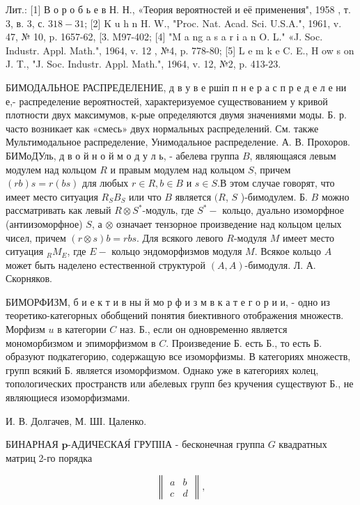 \documentclass[10pt]{article}
\begin{document}
Лит.: [1] В о р о б ь е в Н. Н., «Теория вероятностей и её применения", 1958 , т. 3, в. 3, с. $318-31$; [2] K u h n H. W., "Proc. Nat. Acad. Sci. U.S.A.", 1961, v. 47, № 10, p. 1657-62, [3. M97-402; [4] "M a ng a s a r i a n O. L." «J. Soc. Industr. Appl. Math.", 1964, v. 12 , №4, p. 778-80; [5] L e m k e C. E., H ow s on J. T., "J. Soc. Industr. Appl. Math.", 1964, v. 12, №2, p. 413-23.



БИМОДАЛЬНОЕ РАСПРЕДЕЛЕНИЕ, д в у в е ршіп п н е р а с п р е д е л е ни е,- распределение вероятностей, характеризуемое существованием у кривой плотности двух максимумов, к-рые определяются двумя значениями моды. Б. р. часто возникает как «смесь» двух нормальных распределений. См. также Мультимодальное распределение, Унимодальное распределение. А. В. Прохоров. БИМоДУль, д в о й н о й м о д у л ь, - абелева группа $B$, являющаяся левым модулем над кольцом $R$ и правым модулем над кольцом $S$, причем $(r b) s=r(b s)$ для любых $r \in R, b \in B$ и $s \in S$.В этом случае говорят, что имеет место ситуация $R_{S} B_{S}$ или что $B$ является $(R$, $S$ )-бимодулем. Б. $B$ можно рассматривать как левый $R \otimes S^{*}$-модуль, где $S^{*}-$ кольцо, дуально изоморфное (антиизоморфное) $S$, а $\otimes$ означает тензорное произведение над кольцом целых чисел, причем $(r \otimes s) b=r b s$. Для всякого левого $R$-модуля $M$ имеет место ситуация ${ }_{R} M_{E}$, где $E-$ кольцо эндоморфизмов модуля $M$. Всякое кольцо $A$ может быть наделено естественной структурой $(A, A)$-бимодуля. Л. А. Скорняков.



БИМОРФИЗМ, б и е к т и в ны й мо р ф и з м в к а т е г о р и и, - одно из теоретико-категорных обобщений понятия биективного отображения множеств. Морфизм $u$ в категории $C$ наз. Б., если он одновременно является мономорбизмом и эпиморфизмом в $C$. Произведение Б. есть Б., то есть Б. образуют подкатегорию, содержащую все изоморфизмы. В категориях множеств, групп всякий Б. является изоморфизмом. Однако уже в категориях колец, топологических пространств или абелевых групп без кручения существуют Б., не являющиеся изоморфизмами.



И. В. Долгачев, М. ШІ. Цаленко.



БИНАРНАЯ $\boldsymbol{p}$-АДИЧЕСКАЯ́ ГРУПІІА - бесконечная группа $G$ квадратных матриц 2-го порядка



\[

\left\|\begin{array}{ll}

a & b \\

c & d

\end{array}\right\|,

\]
\end{document}
